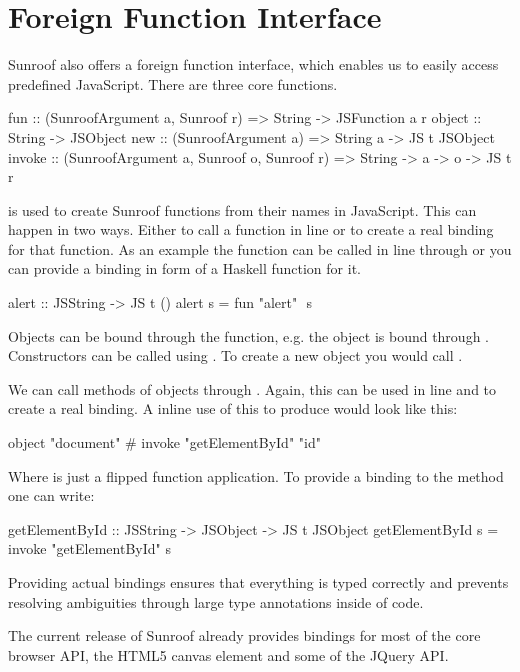  
\section{Foreign Function Interface}
\label{sec:ffi}

Sunroof also offers a 
foreign function interface, which enables us to easily 
access predefined JavaScript. There are three core functions.
\begin{Code}
fun    :: (SunroofArgument a, Sunroof r) 
       => String -> JSFunction a r
object :: String -> JSObject
new    :: (SunroofArgument a) 
       => String a -> JS t JSObject
invoke :: (SunroofArgument a, Sunroof o, Sunroof r) 
       => String -> a -> o -> JS t r
\end{Code}
 is used to create Sunroof functions from their names in JavaScript.
This can happen in two ways. Either to call a function in line or to 
create a real binding for that function. As an example 
the  function can be called in line through 
or you can provide a binding in form of a Haskell function for it.
\begin{Code}
alert :: JSString -> JS t ()
alert s = fun "alert" $$ s
\end{Code}

Objects can be bound through the  function, e.g.
the  object is bound through .
Constructors can be called using . To create a new
object you would call .

We can call methods of objects through . Again, this 
can be used in line and to create a real binding. A inline 
use of this to produce  would look like this: 
\begin{Code}
object "document" # invoke "getElementById" "id"
\end{Code}
Where \Src{\#} is just a flipped function application. To provide a binding 
to the  method one can write:
\begin{Code}
getElementById :: JSString -> JSObject -> JS t JSObject
getElementById s = invoke "getElementById" s
\end{Code}

Providing actual bindings ensures that
everything is typed correctly and prevents resolving ambiguities 
through large type annotations inside of code.

The current release of Sunroof already provides bindings for most of the 
core browser API, the HTML5 canvas element and some of the JQuery API.

